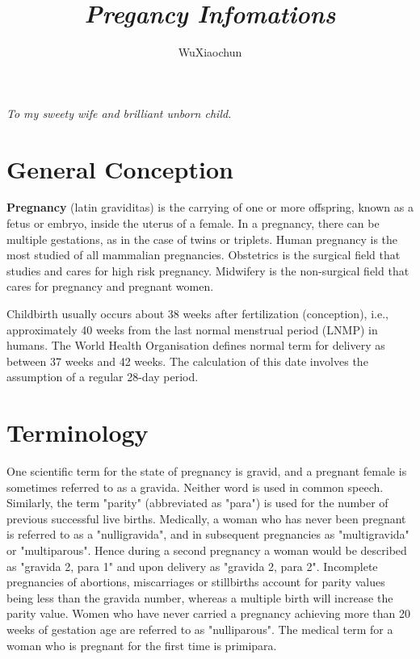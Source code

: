 \documentclass[12pt,a4paper,onecolumn]{article}
\title{\Large{\textit{Pregancy Infomations}}}
\author{WuXiaochun}
\date{}
\begin{document}
\maketitle

\thispagestyle{empty}
\pagebreak

\thispagestyle{empty}
\vfill
\vfill

\begin{center}
{\large {\it To my sweety wife and brilliant unborn child.}}
\end{center}
\vfill
\pagebreak

\setcounter{page}{1}
\pagestyle{plain}
\tableofcontents
\pagebreak
\listoffigures
\pagebreak
\setcounter{page}{1}
\pagestyle{fancy}
\section{General Conception}

\begin{figwindow}
  \textbf{Pregnancy} (latin graviditas) is the carrying of one or more offspring, known as a fetus
  or embryo, inside the uterus of a female. In a pregnancy, there can be multiple gestations, as in
  the case of twins or triplets. Human pregnancy is the most studied of all mammalian pregnancies.
  Obstetrics is the surgical field that studies and cares for high risk pregnancy. Midwifery is the
  non-surgical field that cares for pregnancy and pregnant women.


Childbirth usually occurs about 38 weeks after fertilization (conception), i.e., approximately 40
weeks from the last normal menstrual period (LNMP) in humans. The World Health Organisation defines
normal term for delivery as between 37 weeks and 42 weeks. The calculation of this date involves the
assumption of a regular 28-day period.

\end{figwindow}

\section{Terminology}

One scientific term for the state of pregnancy is gravid, and a pregnant female is sometimes
referred to as a gravida. Neither word is used in common speech. Similarly, the term "parity"
(abbreviated as "para") is used for the number of previous successful live births. Medically, a
woman who has never been pregnant is referred to as a "nulligravida", and in subsequent pregnancies
as "multigravida" or "multiparous". Hence during a second pregnancy a woman would be described as
"gravida 2, para 1" and upon delivery as "gravida 2, para 2". Incomplete pregnancies of abortions,
miscarriages or stillbirths account for parity values being less than the gravida number, whereas a
multiple birth will increase the parity value. Women who have never carried a pregnancy achieving
more than 20 weeks of gestation age are referred to as "nulliparous". The medical term for a woman
who is pregnant for the first time is primipara.
\end{document}
